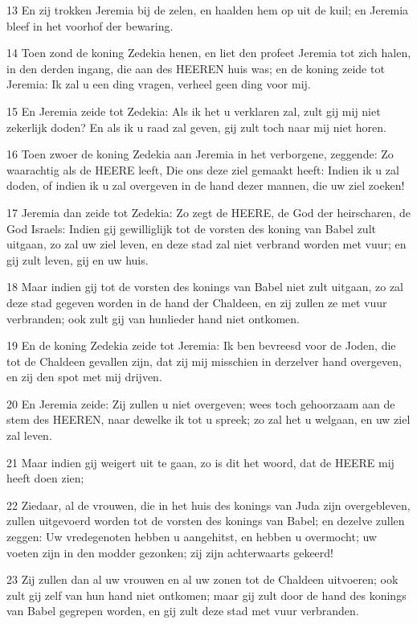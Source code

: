 \par 13 En zij trokken Jeremia bij de zelen, en haalden hem op uit de kuil; en Jeremia bleef in het voorhof der bewaring.
\par 14 Toen zond de koning Zedekia henen, en liet den profeet Jeremia tot zich halen, in den derden ingang, die aan des HEEREN huis was; en de koning zeide tot Jeremia: Ik zal u een ding vragen, verheel geen ding voor mij.
\par 15 En Jeremia zeide tot Zedekia: Als ik het u verklaren zal, zult gij mij niet zekerlijk doden? En als ik u raad zal geven, gij zult toch naar mij niet horen.
\par 16 Toen zwoer de koning Zedekia aan Jeremia in het verborgene, zeggende: Zo waarachtig als de HEERE leeft, Die ons deze ziel gemaakt heeft: Indien ik u zal doden, of indien ik u zal overgeven in de hand dezer mannen, die uw ziel zoeken!
\par 17 Jeremia dan zeide tot Zedekia: Zo zegt de HEERE, de God der heirscharen, de God Israels: Indien gij gewilliglijk tot de vorsten des koning van Babel zult uitgaan, zo zal uw ziel leven, en deze stad zal niet verbrand worden met vuur; en gij zult leven, gij en uw huis.
\par 18 Maar indien gij tot de vorsten des konings van Babel niet zult uitgaan, zo zal deze stad gegeven worden in de hand der Chaldeen, en zij zullen ze met vuur verbranden; ook zult gij van hunlieder hand niet ontkomen.
\par 19 En de koning Zedekia zeide tot Jeremia: Ik ben bevreesd voor de Joden, die tot de Chaldeen gevallen zijn, dat zij mij misschien in derzelver hand overgeven, en zij den spot met mij drijven.
\par 20 En Jeremia zeide: Zij zullen u niet overgeven; wees toch gehoorzaam aan de stem des HEEREN, naar dewelke ik tot u spreek; zo zal het u welgaan, en uw ziel zal leven.
\par 21 Maar indien gij weigert uit te gaan, zo is dit het woord, dat de HEERE mij heeft doen zien;
\par 22 Ziedaar, al de vrouwen, die in het huis des konings van Juda zijn overgebleven, zullen uitgevoerd worden tot de vorsten des konings van Babel; en dezelve zullen zeggen: Uw vredegenoten hebben u aangehitst, en hebben u overmocht; uw voeten zijn in den modder gezonken; zij zijn achterwaarts gekeerd!
\par 23 Zij zullen dan al uw vrouwen en al uw zonen tot de Chaldeen uitvoeren; ook zult gij zelf van hun hand niet ontkomen; maar gij zult door de hand des konings van Babel gegrepen worden, en gij zult deze stad met vuur verbranden.
